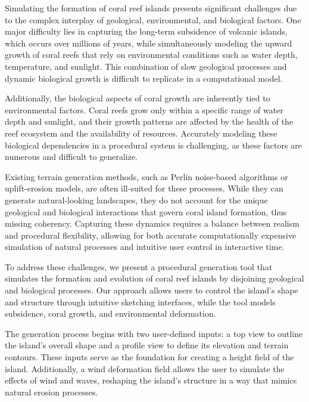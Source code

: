 %

Simulating the formation of coral reef islands presents significant challenges due to the complex interplay of geological, environmental, and biological factors. One major difficulty lies in capturing the long-term subsidence of volcanic islands, which occurs over millions of years, while simultaneously modeling the upward growth of coral reefs that rely on environmental conditions such as water depth, temperature, and sunlight. This combination of slow geological processes and dynamic biological growth is difficult to replicate in a computational model.

Additionally, the biological aspects of coral growth are inherently tied to environmental factors. Coral reefs grow only within a specific range of water depth and sunlight, and their growth patterns are affected by the health of the reef ecosystem and the availability of resources. Accurately modeling these biological dependencies in a procedural system is challenging, as these factors are numerous and difficult to generalize.

Existing terrain generation methods, such as Perlin noise-based algorithms or uplift-erosion models, are often ill-suited for these processes. While they can generate natural-looking landscapes, they do not account for the unique geological and biological interactions that govern coral island formation, thus missing coherency. Capturing these dynamics requires a balance between realism and procedural flexibility, allowing for both accurate computationally expensive simulation of natural processes and intuitive user control in interactive time.

%

To address these challenges, we present a procedural generation tool that simulates the formation and evolution of coral reef islands by disjoining geological and biological processes. Our approach allows users to control the island's shape and structure through intuitive sketching interfaces, while the tool models subsidence, coral growth, and environmental deformation.

The generation process begins with two user-defined inputs: a top view to outline the island's overall shape and a profile view to define its elevation and terrain contours. These inputs serve as the foundation for creating a height field of the island. Additionally, a wind deformation field allows the user to simulate the effects of wind and waves, reshaping the island's structure in a way that mimics natural erosion processes.

